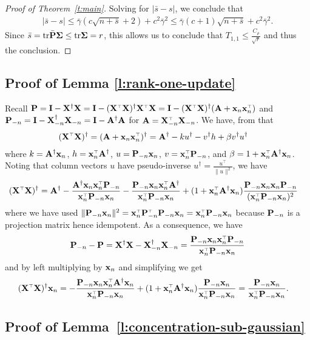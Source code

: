 \documentclass[11pt]{article}
\begin{document}
\begin{proof}[Proof of Theorem~\ref{t:main}]
Solving for $|\bar s-s|$, we conclude that
\begin{align*}
  |\bar s-s|\leq
  \bar\gamma(c\sqrt{n+\bar s}+2) + c^2\bar\gamma^2\leq \bar\gamma
  (c+1)\sqrt{n+\bar s} + c^2\bar\gamma^2.
\end{align*}
Since $\bar s = \tr \bar \P \Sigmab \le \tr \Sigmab =  r $, this allows us to conclude that $T_{1,1} \le \frac{C_\rho}{\sqrt r} $ and thus the conclusion.
\end{proof}


\subsection{Proof of Lemma \ref{l:rank-one-update}}
Recall $\P = \I - \X^\dagger \X = \I - (\X^\top \X)^\dagger \X^\top \X = \I - (\X^\top \X)^\dagger (\A + \x_n \x_n^\top)$ and $\P_{-n} = \I - \X_{-n}^\dagger \X_{-n} = \I - \A^\dagger \A$ for $\A = \X_{-n}^\top \X_{-n}$. We have, from \cite[Theorem 1]{10.2307/2099767} that
\begin{align*}
  (\X^\top \X)^\dag
  &= (\A + \x_n \x_n^\top)^\dag
  = \A^\dag - k u^\dag - v^\dag h + \beta v^\dag u^\dag
\end{align*}
where $k = \A^\dag \x_n$,
$h = \x_n^\top \A^\dag$,
$u = \P_{-n} \x_n$,
$v = \x_n^\top \P_{-n}$,
and $\beta = 1 + \x_n^\top \A^\dag \x_n$.
Noting that column vectors $u$ have
pseudo-inverse $u^\dag = \frac{u^\top}{\|u\|^2}$,
we have
\begin{align*}
  (\X^\top \X)^\dag
  &= \A^\dag
  - \frac{\A^\dag \x_n \x_n^\top \P_{-n}}{\x_n^\top \P_{-n} \x_n}
  - \frac{\P_{-n} \x_n \x_n^\top \A^\dag}{\x_n^\top \P_{-n} \x_n}
  + (1 + \x_n^\top \A^\dag \x_n) \frac{\P_{-n} \x_n \x_n \P_{-n}}{(\x_n^\top \P_{-n} \x_n)^2}
\end{align*}
where we have used
$\|\P_{-n} \x_n\|^2 = \x_n^\top \P_{-n}^\top \P_{-n} \x_n = \x_n^\top \P_{-n} \x_n$
because $\P_{-n}$ is a projection matrix hence idempotent.
As a consequence, we have 
\[
  \P_{-n} - \P = \X^\dagger \X - \X_{-n}^\dagger \X_{-n} = \frac{\P_{-n} \x_n \x_n^\top \P_{-n}}{\x_n^\top \P_{-n} \x_n}
\]
and by left multiplying by $\x_n$ and simplifying we get
\begin{align*}
  (\X^\top \X)^\dag \x_n
  &= - \frac{\P_{-n} \x_n \x_n^\top \A^\dag \x_n}{\x_n^\top \P_{-n} \x_n}
  + (1 + \x_n^\top \A^\dag \x_n) \frac{\P_{-n} \x_n}{\x_n^\top \P_{-n} \x_n}
  = \frac{\P_{-n} \x_n}{\x_n^\top \P_{-n} \x_n}.
\end{align*}


\subsection{Proof of Lemma~\ref{l:concentration-sub-gaussian}}
\end{document}
